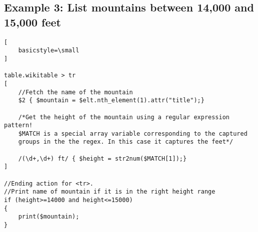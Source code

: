 \documentclass[12pt]{article}
\begin{document}
\subsection*{Example 3: List mountains between 14,000 and 15,000 feet}

\begin{lstlisting}[
    basicstyle=\small
]

table.wikitable > tr
[
	//Fetch the name of the mountain
	$2 { $mountain = $elt.nth_element(1).attr("title");}

	/*Get the height of the mountain using a regular expression pattern! 
	$MATCH is a special array variable corresponding to the captured 
	groups in the the regex. In this case it captures the feet*/
	
	/(\d+,\d+) ft/ { $height = str2num($MATCH[1]);}
]

//Ending action for <tr>.
//Print name of mountain if it is in the right height range
if (height>=14000 and height<=15000)
{
	print($mountain);
}

\end{lstlisting}
\end{document}
